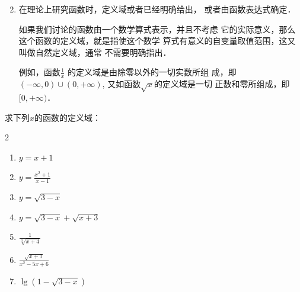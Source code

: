 \begin{enumerate}
    \setcounter{enumi}{1}
    \item 在理论上研究函数时，定义域或者已经明确给出，
    或者由函数表达式确定．

    如果我们讨论的函数由一个数学算式表示，并且不考虑
    它的实际意义，那么这个函数的定义域，就是指使这个数学
    算式有意义的自变量取值范围，这又叫做自然定义域，通常
    不需要明确指出．

    例如，函数$\frac{1}{x}$
    的定义域是由除零以外的一切实数所组
    成，即$(-\infty,0)\cup(0,+\infty)$, 又如函数$\sqrt{x}$的定义域是一切
    正数和零所组成，即$[0,+\infty)$．
\end{enumerate}



\begin{example}    
    求下列$x$的函数的定义域：
    \begin{multicols}{2}
\begin{enumerate}
    \item $y=x+1$
    \item $y=\frac{x^2+1}{x-1}$
    \item $y=\sqrt{3-x}$
    \item $y=\sqrt{3-x}+\sqrt{x+3}$
    \item $\frac{1}{\sqrt[3]{x+4}}$
    \item $\frac{\sqrt{x+1}}{x^2-5x+6}$
    \item $\lg(1-\sqrt{3-x})$
\end{enumerate}        
    \end{multicols}
\end{example}

